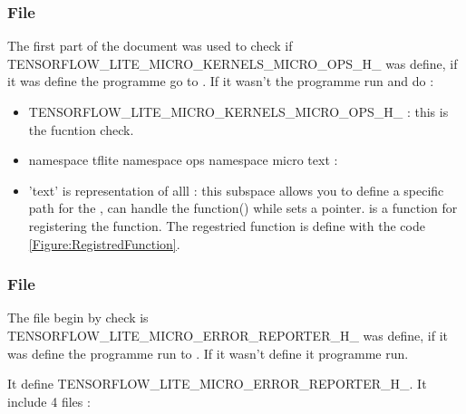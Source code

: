 \subsubsection{File }

\begin{center}
    \label{MicroOps}
\end{center}

The first part of the document was used to check if  TENSORFLOW\_LITE\_MICRO\_KERNELS\_MICRO\_OPS\_H\_ was define, if it was define the programme go to . If it wasn't the programme run and do : 

\begin{itemize}
    \item {} TENSORFLOW\_LITE\_MICRO\_KERNELS\_MICRO\_OPS\_H\_ : this is the fucntion check. 
    \item namespace tflite {namespace ops {namespace micro {text}}} : 
    \item 'text' is representation of alll   : this subspace allows you to define a specific path for the ,  can handle the function() while \PYTHON{ * } sets a pointer.  is a function for registering the function. The regestried function is define with the code \ref{Figure:RegistredFunction}.
\end{itemize} 

\begin{center}
    \label{Figure:RegistredFunction}
\end{center}


\subsubsection{File }

The file begin by check is TENSORFLOW\_LITE\_MICRO\_ERROR\_REPORTER\_H\_ was define, if it was define the programme run to . If it wasn't define it programme run. 

It define TENSORFLOW\_LITE\_MICRO\_ERROR\_REPORTER\_H\_. 
It include 4 files : 

